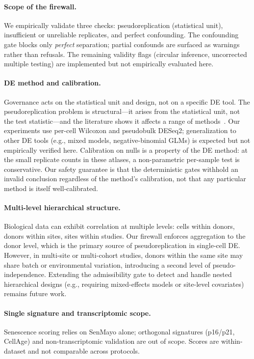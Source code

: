 \documentclass[pmlr,twocolumn,10pt]{jmlr}
\begin{document}
\paragraph{Scope of the firewall.} We empirically validate three checks:
pseudoreplication (statistical unit), insufficient or unreliable replicates,
and perfect confounding. The confounding gate blocks only \textit{perfect}
separation; partial confounds are surfaced as warnings rather than refusals.
The remaining validity flags (circular inference, uncorrected multiple testing)
are implemented but not empirically evaluated here.

\paragraph{DE method and calibration.} Governance acts on the statistical
unit and design, not on a specific DE tool. The pseudoreplication problem is
structural---it arises from the statistical unit, not the test
statistic---and the literature shows it affects a range of
methods~\citep{squair2021,zimmerman2021}. Our experiments use per-cell Wilcoxon
and pseudobulk DESeq2; generalization to other DE tools (e.g., mixed models,
negative-binomial GLMs) is expected but not empirically verified here.
Calibration on nulls is a property of the DE method: at the small replicate
counts in these atlases, a non-parametric per-sample test is conservative.
Our safety guarantee is that the deterministic gates withhold an invalid
conclusion regardless of the method's calibration, not that any particular
method is itself well-calibrated.

\paragraph{Multi-level hierarchical structure.}
Biological data can exhibit correlation at multiple levels: cells within
donors, donors within sites, sites within studies. Our firewall enforces
aggregation to the donor level, which is the primary source of
pseudoreplication in single-cell DE. However, in multi-site or multi-cohort
studies, donors within the same site may share batch or environmental
variation, introducing a second level of pseudo-independence. Extending the
admissibility gate to detect and handle nested hierarchical designs (e.g.,
requiring mixed-effects models or site-level covariates) remains future work.

\paragraph{Single signature and transcriptomic scope.} Senescence scoring relies
on SenMayo alone; orthogonal signatures (p16/p21, CellAge) and non-transcriptomic
validation are out of scope. Scores are within-dataset and not comparable across
protocols.
\end{document}
